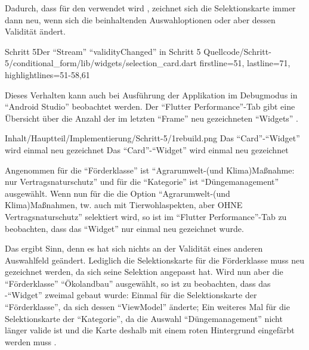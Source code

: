 Dadurch,
dass  für den  verwendet wird ,
zeichnet sich die Selektionskarte immer dann neu,
wenn sich die beinhaltenden Auswahloptionen oder aber dessen Validität ändert.


\begin{alexlisting}{Schritt 5}{Der \enquote{Stream} \enquote{validityChanged} in Schritt 5}
  {Quellcode/Schritt-5/conditional_form/lib/widgets/selection_card.dart}
  {firstline=51, lastline=71, highlightlines={51-58,61}}
  \label{lst:Schritt5needsRepaint}
\end{alexlisting} 

Dieses Verhalten kann auch bei Ausführung der Applikation im Debugmodus in \enquote{Android Studio} beobachtet werden.
Der \enquote{Flutter Performance}-Tab gibt eine Übersicht über die Anzahl der im letzten \enquote{Frame} neu gezeichneten \enquote{Widgets} \Abb{\ref{fig:Schritt51rebuild}}. 
\begin{alexfigure}{Inhalt/Hauptteil/Implementierung/Schritt-5/1rebuild.png}
  {Das \enquote{Card}-\enquote{Widget} wird einmal neu gezeichnet}
  {Das \enquote{Card}-\enquote{Widget} wird einmal neu gezeichnet}

  \label{fig:Schritt51rebuild}

\end{alexfigure}
Angenommen für die \enquote{Förderklasse} ist \enquote{Agrarumwelt-(und Klima)Maßnahme: nur Vertragsnaturschutz} und für die \enquote{Kategorie} ist \enquote{Düngemanagement} ausgewählt.
Wenn nun für die  die Option \enquote{Agrarumwelt-(und Klima)Maßnahmen, tw. auch mit Tierwohlaspekten, aber OHNE Vertragsnaturschutz}  selektiert wird,
so ist im \enquote{Flutter Performance}-Tab zu beobachten,
dass das \enquote{Widget}  nur einmal neu gezeichnet wurde.



Das ergibt Sinn, denn es hat sich nichts an der Validität eines anderen Auswahlfeld geändert.
Lediglich die Selektionskarte für die Förderklasse muss neu gezeichnet werden,
da sich seine Selektion angepasst hat.
Wird nun aber die \enquote{Förderklasse} \enquote{Ökolandbau} ausgewählt,
so ist zu beobachten,
dass das -\enquote{Widget} zweimal gebaut wurde:
Einmal für die Selektionskarte der \enquote{Förderklasse}, da sich dessen \enquote{ViewModel} änderte;
Ein weiteres Mal für die Selektionskarte der \enquote{Kategorie},
da die Auswahl \enquote{Düngemanagement} nicht länger valide ist
und die Karte deshalb mit einem roten Hintergrund eingefärbt werden muss \Abb{\ref{fig:Schritt52rebuilds}}.

